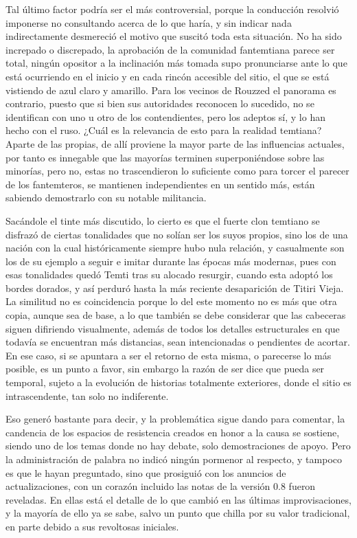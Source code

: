 \documentclass[
]{book}
\begin{document}
Tal último factor podría ser el más controversial, porque la conducción resolvió imponerse no consultando acerca de lo que haría, y sin indicar nada indirectamente desmereció el motivo que suscitó toda esta situación. No ha sido increpado o discrepado, la aprobación de la comunidad fantemtiana parece ser total, ningún opositor a la inclinación más tomada supo pronunciarse ante lo que está ocurriendo en el inicio y en cada rincón accesible del sitio, el que se está vistiendo de azul claro y amarillo. Para los vecinos de Rouzzed el panorama es contrario, puesto que si bien sus autoridades reconocen lo sucedido, no se identifican con uno u otro de los contendientes, pero los adeptos sí, y lo han hecho con el ruso. ¿Cuál es la relevancia de esto para la realidad temtiana? Aparte de las propias, de allí proviene la mayor parte de las influencias actuales, por tanto es innegable que las mayorías terminen superponiéndose sobre las minorías, pero no, estas no trascendieron lo suficiente como para torcer el parecer de los fantemteros, se mantienen independientes en un sentido más, están sabiendo demostrarlo con su notable militancia.

Sacándole el tinte más discutido, lo cierto es que el fuerte clon temtiano se disfrazó de ciertas tonalidades que no solían ser los suyos propios, sino los de una nación con la cual históricamente siempre hubo nula relación, y casualmente son los de su ejemplo a seguir e imitar durante las épocas más modernas, pues con esas tonalidades quedó Temti tras su alocado resurgir, cuando esta adoptó los bordes dorados, y así perduró hasta la más reciente desaparición de Titiri Vieja. La similitud no es coincidencia porque lo del este momento no es más que otra copia, aunque sea de base, a lo que también se debe considerar que las cabeceras siguen difiriendo visualmente, además de todos los detalles estructurales en que todavía se encuentran más distancias, sean intencionadas o pendientes de acortar. En ese caso, si se apuntara a ser el retorno de esta misma, o parecerse lo más posible, es un punto a favor, sin embargo la razón de ser dice que pueda ser temporal, sujeto a la evolución de historias totalmente exteriores, donde el sitio es intrascendente, tan solo no indiferente.

Eso generó bastante para decir, y la problemática sigue dando para comentar, la candencia de los espacios de resistencia creados en honor a la causa se sostiene, siendo uno de los temas donde no hay debate, solo demostraciones de apoyo. Pero la administración de palabra no indicó ningún pormenor al respecto, y tampoco es que le hayan preguntado, sino que prosiguió con los anuncios de actualizaciones, con un corazón incluido las notas de la versión 0.8 fueron reveladas. En ellas está el detalle de lo que cambió en las últimas improvisaciones, y la mayoría de ello ya se sabe, salvo un punto que chilla por su valor tradicional, en parte debido a sus revoltosas iniciales.
\end{document}

